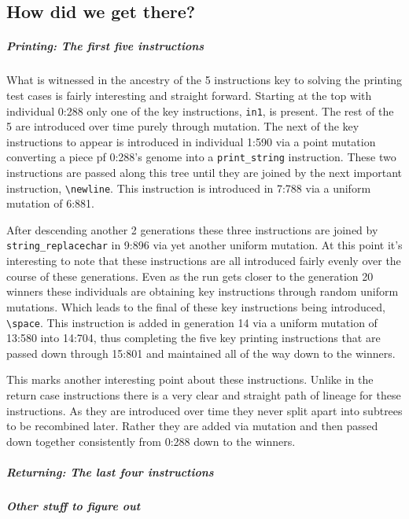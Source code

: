 \subsection{How did we get there?}

\subparagraph{Printing: The first five instructions}
What is witnessed in the ancestry of the 5 instructions key to solving the printing test
cases is fairly interesting and straight forward. Starting at the top with individual 0:288 only
one of the key instructions, \texttt{in1}, is present. The rest of the 5 are introduced over time purely
through mutation. The next of the key instructions to appear is introduced in individual 1:590 via a point
mutation converting a piece pf 0:288's genome into a \texttt{print\_string} instruction. These two
instructions are passed along this tree until they are joined by the next important instruction,
\texttt{\textbackslash newline}. This instruction is introduced in 7:788 via a uniform mutation
of 6:881.

After descending another 2 generations these three instructions are joined by \texttt{string\_replacechar}
in 9:896 via yet another uniform mutation. At this point it's interesting to note that these instructions are
all introduced fairly evenly over the course of these generations. Even as the run gets closer to the generation
20 winners these individuals are obtaining key instructions through random uniform mutations. Which leads to
the final of these key instructions being introduced, \texttt{\textbackslash space}. This instruction is added in generation 14 via a uniform mutation of 13:580 into 14:704, thus completing the five key printing
instructions that are passed down through 15:801 and maintained all of the way down to the winners.

This marks another interesting point about these instructions. Unlike in the return case instructions there is a 
very clear and straight path of lineage for these instructions. As they are introduced over time they 
never split apart into subtrees to be recombined later. Rather they are added via mutation and 
then passed down together consistently from 0:288 down to the winners. 

\subparagraph{Returning: The last four instructions}

\subparagraph{Other stuff to figure out}

